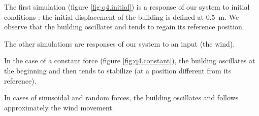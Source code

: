 The first simulation (figure \ref{fig:q4.initial}) is a response of our system to initial conditions : the initial displacement of the building is defined at \SI{0.5}{\meter}. We observe that the building oscillates and tends to regain its reference position.\par
The other simulations are responses of our system to an input (the wind).\par
In the case of a constant force (figure \ref{fig:q4.constant}), the building oscillates at the beginning and then tends to stabilize (at a position different from its reference).\par
In cases of sinusoidal and random forces, the building oscillates and follows approximately the wind movement.
